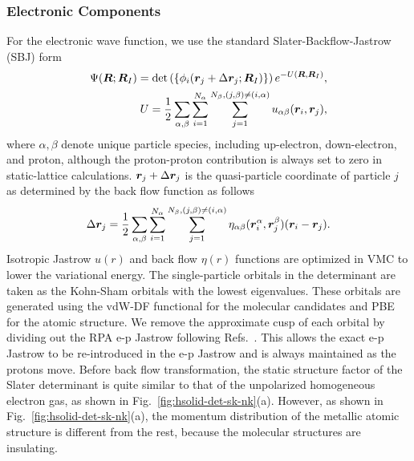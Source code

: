 \subsubsection{Electronic Components}
For the electronic wave function, we use the standard Slater-Backflow-Jastrow (SBJ) form
\begin{align}
\Psi(\boldsymbol{R};\boldsymbol{R}_I) = \det\left( \{ \phi_i(\boldsymbol{r}_j+\Delta\boldsymbol{r}_j;\boldsymbol{R}_I)\} \right) e^{-U(\boldsymbol{R},\boldsymbol{R}_I)}, \\
U = \frac{1}{2}\sum\limits_{\alpha, \beta} \sum\limits_{i=1}^{N_\alpha} \sum\limits_{j=1}^{N_\beta, (j,\beta)\neq(i,\alpha)} u_{\alpha\beta}(\boldsymbol{r}_i, \boldsymbol{r}_j), \label{eq:hsolid-ujas}
\end{align}
where $\alpha, \beta$ denote unique particle species, including up-electron, down-electron, and proton, although the proton-proton contribution is always set to zero in static-lattice calculations. $\boldsymbol{r}_j+\Delta\boldsymbol{r}_j$ is the quasi-particle coordinate of particle $j$ as determined by the back flow function as follows
\begin{align}
\Delta \boldsymbol{r}_j = \frac{1}{2}\sum\limits_{\alpha, \beta} \sum\limits_{i=1}^{N_\alpha} \sum\limits_{j=1}^{N_\beta, (j,\beta)\neq(i,\alpha)} \eta_{\alpha\beta}(\boldsymbol{r}_i^\alpha, \boldsymbol{r}_j^\beta)(\boldsymbol{r}_i-\boldsymbol{r}_j).
\label{eq:hsolid-bf}
\end{align}
Isotropic Jastrow $u(r)$ and back flow $\eta(r)$ functions are optimized in VMC to lower the variational energy.
The single-particle orbitals in the determinant are taken as the Kohn-Sham orbitals with the lowest eigenvalues.
These orbitals are generated using the vdW-DF functional for the molecular candidates and PBE for the atomic structure. We remove the approximate cusp of each orbital by dividing out the RPA e-p Jastrow following Refs.~\cite{Ceperley1987,Natoli1993,Natoli1995}.
This allows the exact e-p Jastrow to be re-introduced in the e-p Jastrow and is always maintained as the protons move.
Before back flow transformation, the static structure factor of the Slater determinant is quite similar to that of the unpolarized homogeneous electron gas, as shown in Fig.~\ref{fig:hsolid-det-sk-nk}(a). However, as shown in  Fig.~\ref{fig:hsolid-det-sk-nk}(a), the momentum distribution of the metallic atomic structure is different from the rest, because the molecular structures are insulating.

